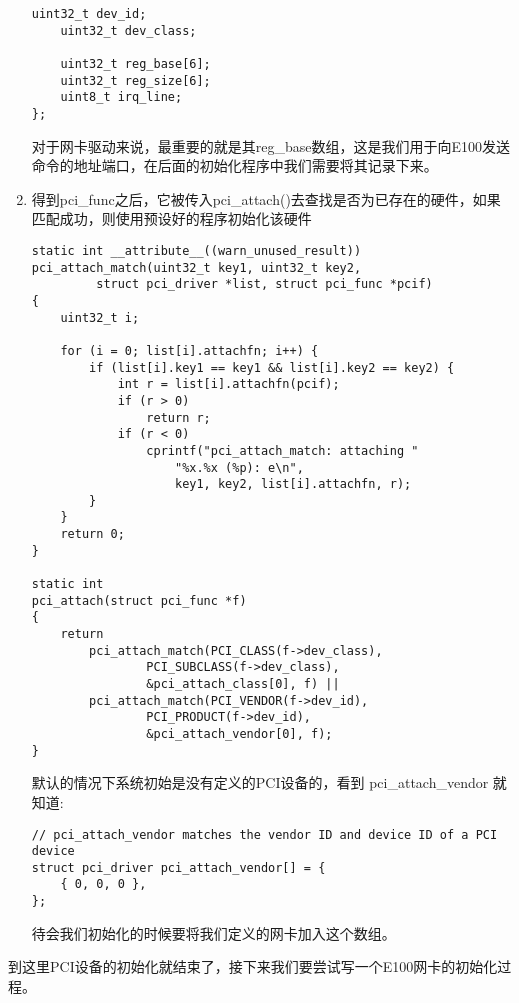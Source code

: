 \documentclass{article}
\newcommand{\funcname}[1]{{\ttfamily \small #1}}
\begin{document}
\begin{CJK*}{UTF8}{gkai}
\begin{enumerate}
{\begin{lstlisting}[style=ccode, firstnumber=11, title={\scriptsize \ttfamily \bfseries kern/pci.h}]
    uint32_t dev_id;
    uint32_t dev_class;

    uint32_t reg_base[6];
    uint32_t reg_size[6];
    uint8_t irq_line;
};
\end{lstlisting}

对于网卡驱动来说，最重要的就是其reg\_base数组，这是我们用于向E100发送命令的地址端口，在后面的初始化程序中我们需要将其记录下来。

}

\item{得到pci\_func之后，它被传入\funcname{pci\_attach()}去查找是否为已存在的硬件，如果匹配成功，则使用预设好的程序初始化该硬件

\begin{lstlisting}[style=ccode, firstnumber=67, title={\scriptsize \ttfamily \bfseries kern/pci.c}]
static int __attribute__((warn_unused_result))
pci_attach_match(uint32_t key1, uint32_t key2,
		 struct pci_driver *list, struct pci_func *pcif)
{
    uint32_t i;
	
    for (i = 0; list[i].attachfn; i++) {
        if (list[i].key1 == key1 && list[i].key2 == key2) {
            int r = list[i].attachfn(pcif);
            if (r > 0)
                return r;
            if (r < 0)
                cprintf("pci_attach_match: attaching "
                    "%x.%x (%p): e\n",
                    key1, key2, list[i].attachfn, r);
        }
    }
    return 0;
}

static int
pci_attach(struct pci_func *f)
{
    return
        pci_attach_match(PCI_CLASS(f->dev_class), 
                PCI_SUBCLASS(f->dev_class),
                &pci_attach_class[0], f) ||
        pci_attach_match(PCI_VENDOR(f->dev_id), 
                PCI_PRODUCT(f->dev_id),
                &pci_attach_vendor[0], f);
}
\end{lstlisting}

默认的情况下系统初始是没有定义的PCI设备的，看到 pci\_attach\_vendor 就知道:

\begin{lstlisting}[style=ccode, firstnumber=31, title={\scriptsize \ttfamily \bfseries kern/pci.c}]
// pci_attach_vendor matches the vendor ID and device ID of a PCI device
struct pci_driver pci_attach_vendor[] = {
	{ 0, 0, 0 },
};
\end{lstlisting}

待会我们初始化的时候要将我们定义的网卡加入这个数组。

}
\end{enumerate}

到这里PCI设备的初始化就结束了，接下来我们要尝试写一个E100网卡的初始化过程。


\end{CJK*}
\end{document}
